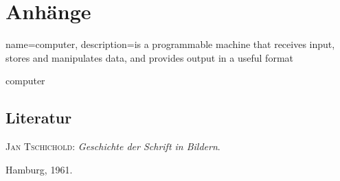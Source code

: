 \part{Anhänge}

{ name=computer,
  description={is a programmable machine that receives input,
               stores and manipulates data, and provides
               output in a useful format}
}

\gls{computer}
\printglossaries

\chapter{Literatur}
\label{sec:Literatur}
\textsc{Jan Tschichold}:\textit{ Geschichte der Schrift in
  Bildern}.\par \hspace{9.0 pt} Hamburg, 1961.


